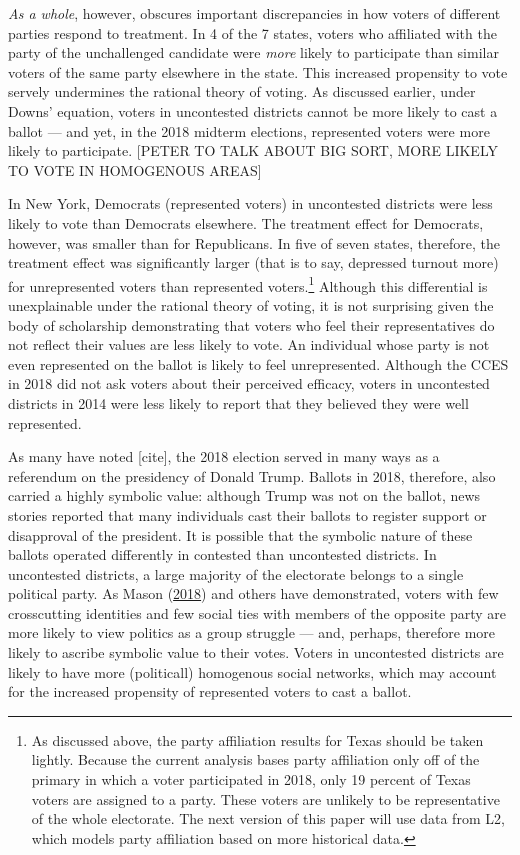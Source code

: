 \documentclass[
  12pt,
]{article}
\begin{document}
\emph{As a whole}, however, obscures important discrepancies in how voters of different parties respond to treatment. In 4 of the 7 states, voters who affiliated with the party of the unchallenged candidate were \emph{more} likely to participate than similar voters of the same party elsewhere in the state. This increased propensity to vote servely undermines the rational theory of voting. As discussed earlier, under Downs' equation, voters in uncontested districts cannot be more likely to cast a ballot --- and yet, in the 2018 midterm elections, represented voters were more likely to participate. {[}PETER TO TALK ABOUT BIG SORT, MORE LIKELY TO VOTE IN HOMOGENOUS AREAS{]}

In New York, Democrats (represented voters) in uncontested districts were less likely to vote than Democrats elsewhere. The treatment effect for Democrats, however, was smaller than for Republicans. In five of seven states, therefore, the treatment effect was significantly larger (that is to say, depressed turnout more) for unrepresented voters than represented voters.\footnote{As discussed above, the party affiliation results for Texas should be taken lightly. Because the current analysis bases party affiliation only off of the primary in which a voter participated in 2018, only 19 percent of Texas voters are assigned to a party. These voters are unlikely to be representative of the whole electorate. The next version of this paper will use data from L2, which models party affiliation based on more historical data.} Although this differential is unexplainable under the rational theory of voting, it is not surprising given the body of scholarship demonstrating that voters who feel their representatives do not reflect their values are less likely to vote. An individual whose party is not even represented on the ballot is likely to feel unrepresented. Although the CCES in 2018 did not ask voters about their perceived efficacy, voters in uncontested districts in 2014 were less likely to report that they believed they were well represented.

As many have noted {[}cite{]}, the 2018 election served in many ways as a referendum on the presidency of Donald Trump. Ballots in 2018, therefore, also carried a highly symbolic value: although Trump was not on the ballot, news stories reported that many individuals cast their ballots to register support or disapproval of the president. It is possible that the symbolic nature of these ballots operated differently in contested than uncontested districts. In uncontested districts, a large majority of the electorate belongs to a single political party. As Mason (\protect\hyperlink{ref-Mason2018}{2018}) and others have demonstrated, voters with few crosscutting identities and few social ties with members of the opposite party are more likely to view politics as a group struggle --- and, perhaps, therefore more likely to ascribe symbolic value to their votes. Voters in uncontested districts are likely to have more (politicall) homogenous social networks, which may account for the increased propensity of represented voters to cast a ballot.
\end{document}

